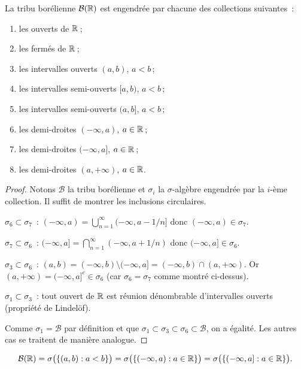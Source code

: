 \begin{theoreme}
\label{thm:generateurs_boreliens}
La tribu bor\'elienne $\mathcal{B}(\R)$ est engendr\'ee par chacune des collections
suivantes~:
\begin{enumerate}
    \item les ouverts de $\mathbb{R}$\,;
    \item les ferm\'es de $\mathbb{R}$\,;
    \item les intervalles ouverts $(a, b)$, $a < b$\,;
    \item les intervalles semi-ouverts $[a, b)$, $a < b$\,;
    \item les intervalles semi-ouverts $(a, b]$, $a < b$\,;
    \item les demi-droites $(-\infty, a)$, $a \in \mathbb{R}$\,;
    \item les demi-droites $(-\infty, a]$, $a \in \mathbb{R}$\,;
    \item les demi-droites $(a, +\infty)$, $a \in \mathbb{R}$.
\end{enumerate}
\end{theoreme}

\begin{proof}
Notons $\mathcal{B}$ la tribu bor\'elienne et $\sigma_i$ la $\sigma$-alg\`ebre
engendr\'ee par la $i$-\`eme collection. Il suffit de montrer les inclusions
circulaires.

$\sigma_6 \subset \sigma_7$~: $(-\infty, a) = \bigcup_{n=1}^{\infty}
(-\infty, a - 1/n]$ donc $(-\infty, a) \in \sigma_7$.

$\sigma_7 \subset \sigma_6$~: $(-\infty, a] = \bigcap_{n=1}^{\infty}
(-\infty, a + 1/n)$ donc $(-\infty, a] \in \sigma_6$.

$\sigma_3 \subset \sigma_6$~: $(a, b) = (-\infty, b) \setminus (-\infty, a]
= (-\infty, b) \cap (a, +\infty)$. Or $(a, +\infty) = (-\infty, a]^c \in \sigma_6$
(car $\sigma_6 = \sigma_7$ comme montr\'e ci-dessus).

$\sigma_1 \subset \sigma_3$~: tout ouvert de $\mathbb{R}$ est r\'eunion d\'enombrable
d'intervalles ouverts (propri\'et\'e de Lindel\"of).

Comme $\sigma_1 = \mathcal{B}$ par d\'efinition et que
$\sigma_1 \subset \sigma_3 \subset \sigma_6 \subset \mathcal{B}$, on a \'egalit\'e.
Les autres cas se traitent de mani\`ere analogue.
\end{proof}

\begin{formules}[title=\textbf{G\'en\'erateurs courants de $\mathcal{B}(\R)$}]
\[
\mathcal{B}(\mathbb{R}) = \sigma\bigl(\{(a,b) : a < b\}\bigr)
= \sigma\bigl(\{(-\infty, a) : a \in \mathbb{R}\}\bigr)
= \sigma\bigl(\{(-\infty, a] : a \in \mathbb{R}\}\bigr).
\]
\end{formules}

